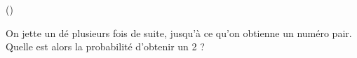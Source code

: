 \begin{exercice}\label{exo3-7} (\minsyndical)

On jette un d\'e plusieurs fois de suite, jusqu'\`a ce qu'on obtienne un num\'ero pair. 
Quelle est alors la probabilit\'e d'obtenir un 2 ?\\

\end{exercice}
